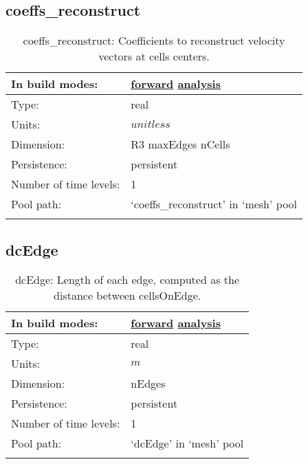 \subsection[coeffs\_reconstruct]{coeffs\_reconstruct}
\label{subsec:var_sec_mesh_coeffs_reconstruct}
\begin{center}
\begin{longtable}{| p{2.0in} | p{4.0in} |}
        \hline 
        In build modes: & \hyperref[subsec:forward_var_tab_mesh]{forward} \hyperref[subsec:analysis_var_tab_mesh]{analysis} \\
        \hline 
        Type: & real \\
        \hline 
        Units: & $unitless$ \\
        \hline 
        Dimension: & R3 maxEdges nCells \\
        \hline 
        Persistence: & persistent \\
        \hline 
        Number of time levels: & 1 \\
        \hline 
            Pool path: & `coeffs\_reconstruct' in `mesh' pool \\
		 \hline 
    \caption{coeffs\_reconstruct: Coefficients to reconstruct velocity vectors at cells centers.}
\end{longtable}
\end{center}
\subsection[dcEdge]{dcEdge}
\label{subsec:var_sec_mesh_dcEdge}
\begin{center}
\begin{longtable}{| p{2.0in} | p{4.0in} |}
        \hline 
        In build modes: & \hyperref[subsec:forward_var_tab_mesh]{forward} \hyperref[subsec:analysis_var_tab_mesh]{analysis} \\
        \hline 
        Type: & real \\
        \hline 
        Units: & $m$ \\
        \hline 
        Dimension: & nEdges \\
        \hline 
        Persistence: & persistent \\
        \hline 
        Number of time levels: & 1 \\
        \hline 
            Pool path: & `dcEdge' in `mesh' pool \\
		 \hline 
    \caption{dcEdge: Length of each edge, computed as the distance between cellsOnEdge.}
\end{longtable}
\end{center}
